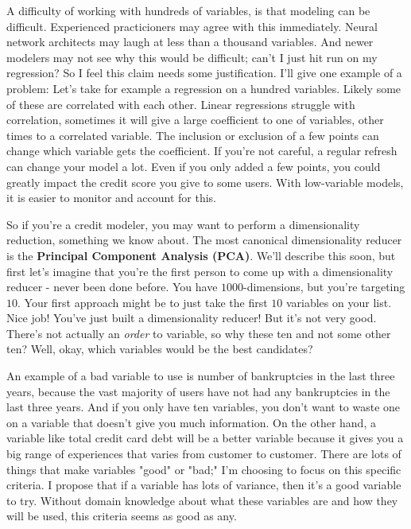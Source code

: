 \documentclass{amsbook}
\begin{document}
A difficulty of working with hundreds of variables, is that modeling can be difficult.  Experienced practicioners may agree with this immediately.  Neural network architects may laugh at less than a thousand variables.  And newer modelers may not see why this would be difficult; can't I just hit run on my regression?  So I feel this claim needs some justification.  I'll give one example of a problem:  Let's take for example a regression on a hundred variables.  Likely some of these are correlated with each other.  Linear regressions struggle with correlation, sometimes it will give a large coefficient to one of variables, other times to a correlated variable.  The inclusion or exclusion of a few points can change which variable gets the coefficient.  If you're not careful, a regular refresh can change your model a lot.  Even if you only added a few points, you could greatly impact the credit score you give to some users.  With low-variable models, it is easier to monitor and account for this.

So if you're a credit modeler, you may want to perform a dimensionality reduction, something we know about.  The most canonical dimensionality reducer is the {\bf Principal Component Analysis (PCA)}.  We'll describe this soon, but first let's imagine that you're the first person to come up with a dimensionality reducer - never been done before.  You have $1000$-dimensions, but you're targeting $10$.  Your first approach might be to just take the first $10$ variables on your list.  Nice job!  You've just built a dimensionality reducer!  But it's not very good.  There's not actually an {\em order} to variable, so why these ten and not some other ten?  Well, okay, which variables would be the best candidates?

An example of a bad variable to use is number of bankruptcies in the last three years, because the vast majority of users have not had any bankruptcies in the last three years.  And if you only have ten variables, you don't want to waste one on a variable that doesn't give you much information.  On the other hand, a variable like total credit card debt will be a better variable because it gives you a big range of experiences that varies from customer to customer.  There are lots of things that make variables "good" or "bad;" I'm choosing to focus on this specific criteria.  I propose that if a variable has lots of variance, then it's a good variable to try.  Without domain knowledge about what these variables are and how they will be used, this criteria seems as good as any.
\end{document}
